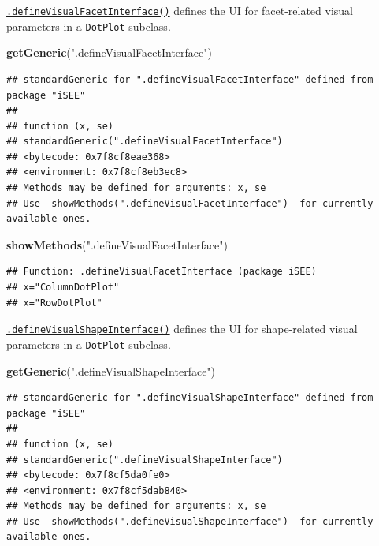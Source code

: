 \documentclass[
]{book}
\newenvironment{Shaded}{\begin{snugshade}}{\end{snugshade}}
\newcommand{\KeywordTok}[1]{\textcolor[rgb]{0.13,0.29,0.53}{\textbf{#1}}}
\newcommand{\NormalTok}[1]{#1}
\newcommand{\StringTok}[1]{\textcolor[rgb]{0.31,0.60,0.02}{#1}}
\begin{document}
\href{https://isee.github.io/iSEE/reference/visual-parameters-generics.html}{\texttt{.defineVisualFacetInterface()}} defines the UI for facet-related visual parameters in a \texttt{DotPlot} subclass.

\begin{Shaded}
\begin{Highlighting}[]
\KeywordTok{getGeneric}\NormalTok{(}\StringTok{".defineVisualFacetInterface"}\NormalTok{)}
\end{Highlighting}
\end{Shaded}

\begin{verbatim}
## standardGeneric for ".defineVisualFacetInterface" defined from package "iSEE"
## 
## function (x, se) 
## standardGeneric(".defineVisualFacetInterface")
## <bytecode: 0x7f8cf8eae368>
## <environment: 0x7f8cf8eb3ec8>
## Methods may be defined for arguments: x, se
## Use  showMethods(".defineVisualFacetInterface")  for currently available ones.
\end{verbatim}

\begin{Shaded}
\begin{Highlighting}[]
\KeywordTok{showMethods}\NormalTok{(}\StringTok{".defineVisualFacetInterface"}\NormalTok{)}
\end{Highlighting}
\end{Shaded}

\begin{verbatim}
## Function: .defineVisualFacetInterface (package iSEE)
## x="ColumnDotPlot"
## x="RowDotPlot"
\end{verbatim}

\href{https://isee.github.io/iSEE/reference/visual-parameters-generics.html}{\texttt{.defineVisualShapeInterface()}} defines the UI for shape-related visual parameters in a \texttt{DotPlot} subclass.

\begin{Shaded}
\begin{Highlighting}[]
\KeywordTok{getGeneric}\NormalTok{(}\StringTok{".defineVisualShapeInterface"}\NormalTok{)}
\end{Highlighting}
\end{Shaded}

\begin{verbatim}
## standardGeneric for ".defineVisualShapeInterface" defined from package "iSEE"
## 
## function (x, se) 
## standardGeneric(".defineVisualShapeInterface")
## <bytecode: 0x7f8cf5da0fe0>
## <environment: 0x7f8cf5dab840>
## Methods may be defined for arguments: x, se
## Use  showMethods(".defineVisualShapeInterface")  for currently available ones.
\end{verbatim}
\end{document}

